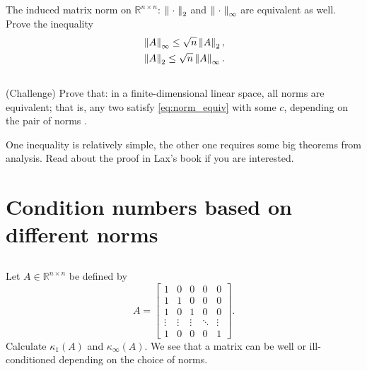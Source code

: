 \documentclass[11pt,letterpaper]{report}
\begin{document}
\subsection{}
The induced matrix norm on $\mathbb{R}^{n\times n}$: $\left\Vert \;\cdot\; \right\Vert_{2}$ and $\left\Vert \;\cdot\; \right\Vert_{\infty}$ are equivalent as well. Prove the inequality
\begin{align*}
    &\left\Vert A \right\Vert_\infty \leq \sqrt{n}\left\Vert A \right\Vert_2,\\
    &\left\Vert A \right\Vert_2 \leq \sqrt{n}\left\Vert A \right\Vert_\infty.
\end{align*}

\subsection{}
(Challenge) Prove that: in a finite-dimensional linear space, all norms are equivalent; that is, any two satisfy \eqref{eq:norm_equiv} with some $c$, depending on the pair of norms \cite[p.217]{Lax_07}.

One inequality is relatively simple, the other one requires some big theorems from analysis. Read about the proof in Lax's book if you are interested.

\section{Condition numbers based on different norms}
\subsection{}
Let $A \in \mathbb{R}^{n\times n}$ be defined by
\begin{equation*}
    A = %
    \begin{bmatrix}
      1      & 0      & 0      & 0      &  0      \\ 
      1      & 1      & 0      & 0      &  0      \\
      1      & 0      & 1      & 0      &  0      \\
      \vdots & \vdots & \vdots & \ddots &  \vdots \\
      1      & 0      & 0      & 0      &  1
    \end{bmatrix}.
\end{equation*}
Calculate $\kappa_1(A)$ and $\kappa_\infty(A)$. We see that a matrix can be well or ill-conditioned depending on the choice of norms.
\end{document}
